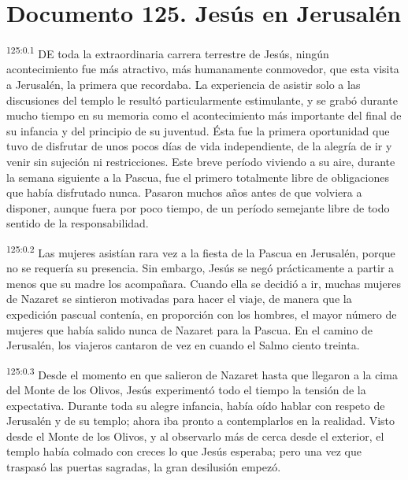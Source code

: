 \chapter{Documento 125. Jesús en Jerusalén}
\par 
\textsuperscript{125:0.1} DE toda la extraordinaria carrera terrestre de Jesús, ningún acontecimiento fue más atractivo, más humanamente conmovedor, que esta visita a Jerusalén, la primera que recordaba. La experiencia de asistir solo a las discusiones del templo le resultó particularmente estimulante, y se grabó durante mucho tiempo en su memoria como el acontecimiento más importante del final de su infancia y del principio de su juventud. Ésta fue la primera oportunidad que tuvo de disfrutar de unos pocos días de vida independiente, de la alegría de ir y venir sin sujeción ni restricciones. Este breve período viviendo a su aire, durante la semana siguiente a la Pascua, fue el primero totalmente libre de obligaciones que había disfrutado nunca. Pasaron muchos años antes de que volviera a disponer, aunque fuera por poco tiempo, de un período semejante libre de todo sentido de la responsabilidad.

\par 
\textsuperscript{125:0.2} Las mujeres asistían rara vez a la fiesta de la Pascua en Jerusalén, porque no se requería su presencia. Sin embargo, Jesús se negó prácticamente a partir a menos que su madre los acompañara. Cuando ella se decidió a ir, muchas mujeres de Nazaret se sintieron motivadas para hacer el viaje, de manera que la expedición pascual contenía, en proporción con los hombres, el mayor número de mujeres que había salido nunca de Nazaret para la Pascua. En el camino de Jerusalén, los viajeros cantaron de vez en cuando el Salmo ciento treinta.

\par 
\textsuperscript{125:0.3} Desde el momento en que salieron de Nazaret hasta que llegaron a la cima del Monte de los Olivos, Jesús experimentó todo el tiempo la tensión de la expectativa. Durante toda su alegre infancia, había oído hablar con respeto de Jerusalén y de su templo; ahora iba pronto a contemplarlos en la realidad. Visto desde el Monte de los Olivos, y al observarlo más de cerca desde el exterior, el templo había colmado con creces lo que Jesús esperaba; pero una vez que traspasó las puertas sagradas, la gran desilusión empezó.

